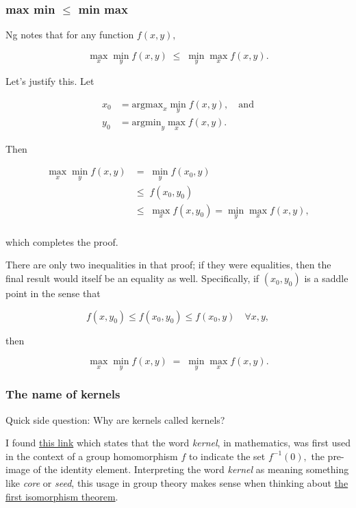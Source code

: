 \documentclass[]{article}
\begin{document}
\subsubsection{\texorpdfstring{max min \(\le\) min
max}{max min \textbackslash{}le min max}}\label{max-min-le-min-max}

Ng notes that for any function \(f(x, y),\)

\[\max_x \min_y f(x, y) \;\le\; \min_y \max_x f(x, y).\]

Let's justify this. Let

\newcommand{\argmax}{\text{argmax}}
\newcommand{\argmin}{\text{argmin}}

\[\begin{aligned}
x_0 & = \argmax_x \min_y f(x, y), \quad \text{and} \\
y_0 & = \argmin_y \max_x f(x, y).
\end{aligned}\]

Then

\[\begin{aligned}
\max_x \min_y f(x, y) & =   \; \min_y f(x_0, y) \\
                      & \le \; f(x_0, y_0)      \\
                      & \le \; \max_x f(x, y_0) = \min_y \max_x f(x, y), \\
\end{aligned}\]

which completes the proof.

There are only two inequalities in that proof; if they were equalities,
then the final result would itself be an equality as well. Specifically,
if \((x_0, y_0)\) is a saddle point in the sense that

\[f(x, y_0) \le f(x_0, y_0) \le f(x_0, y) \quad \forall x, y,\]

then

\[\max_x \min_y f(x, y) \; = \; \min_y \max_x f(x, y).\]

\subsubsection{The name of kernels}\label{the-name-of-kernels}

Quick side question: Why are kernels called kernels?

I found
\href{http://math.stackexchange.com/questions/500920/word-origin-meaning-of-kernel-in-linear-algebra}{this
link} which states that the word \emph{kernel}, in mathematics, was
first used in the context of a group homomorphism \(f\) to indicate the
set \(f^{-1}(0),\) the pre-image of the identity element. Interpreting
the word \emph{kernel} as meaning something like \emph{core} or
\emph{seed}, this usage in group theory makes sense when thinking about
\href{https://en.wikipedia.org/wiki/Fundamental_theorem_on_homomorphisms\#Group_theoretic_version}{the
first isomorphism theorem}.
\end{document}
